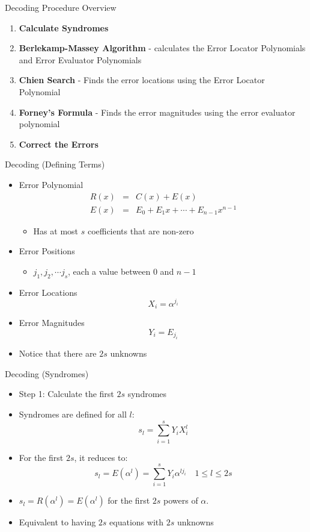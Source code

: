 \documentclass[]{prosper}
\begin{document}
\begin{slide}{Decoding Procedure Overview}
\begin{enumerate}
    \item {\bf Calculate Syndromes}
    \item {\bf Berlekamp-Massey Algorithm} - calculates the Error Locator Polynomials and Error Evaluator Polynomials
    \item {\bf Chien Search} - Finds the error locations using the Error Locator Polynomial
    \item {\bf Forney's Formula} - Finds the error magnitudes using the error evaluator polynomial
    \item {\bf Correct the Errors}
\end{enumerate}
\end{slide}

\begin{slide}{Decoding (Defining Terms)}
\begin{itemize}
    \item Error Polynomial
    \begin{eqnarray*}
    R(x) &=& C(x) + E(x) \\
    E(x) &=& E_0 + E_1x + \cdots + E_{n-1}x^{n-1}
    \end{eqnarray*}
    \begin{itemize}
        \item Has at most $s$ coefficients that are non-zero
    \end{itemize}

    \item Error Positions
    \begin{itemize}
        \item $j_1, j_2, \cdots j_s$, each a value between $0$ and $n-1$
    \end{itemize}

    \item Error Locations
    \[ X_i = \alpha^{j_i} \]

    \item Error Magnitudes
    \[ Y_i = E_{j_i} \]
    \item Notice that there are $2s$ unknowns
\end{itemize}
\end{slide}

\begin{slide}{Decoding (Syndromes)}
\begin{itemize}
    \item Step 1: Calculate the first $2s$ syndromes
    \item Syndromes are defined for all $l$:
    \[ s_l = \sum_{i=1}^s Y_i X_i^l \]
    \item For the first $2s$, it reduces to:
    \[ s_l = E(\alpha ^l) = \sum_{i=1}^s Y_i \alpha^{lj_i} \quad 1 \le l \le 2s \]
    \item $s_l = R(\alpha^l) = E(\alpha^l)$ for the first $2s$ powers of $\alpha$.
    \item Equivalent to having $2s$ equations with $2s$ unknowns
\end{itemize}
\end{slide}
\end{document}

